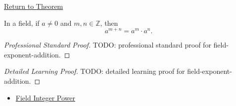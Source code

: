 \newpage
{}
\label{prf:field-exponent-addition}

\begin{remark*}[Return]
\hyperref[def:integer-power-on-q]{Return to Theorem}
\end{remark*}

\begin{theorem*}
In a field, if $a\ne0$ and $m,n\in\mathbb{Z}$, then
\[
a^{m+n}=a^m\cdot a^n.
\]
\end{theorem*}

\begin{proof}[Professional Standard Proof]
\LRAProofBodyStart
TODO: professional standard proof for field-exponent-addition.
\end{proof}

\begin{proof}[Detailed Learning Proof]
\LRAProofBodyStart
TODO: detailed learning proof for field-exponent-addition.
\end{proof}

\begin{remark*}
\end{remark*}

\begin{dependencies}
\begin{itemize}
  \item \hyperref[def:two-sided-inverse]{Field Integer Power}
\end{itemize}
\end{dependencies}

\clearpage
